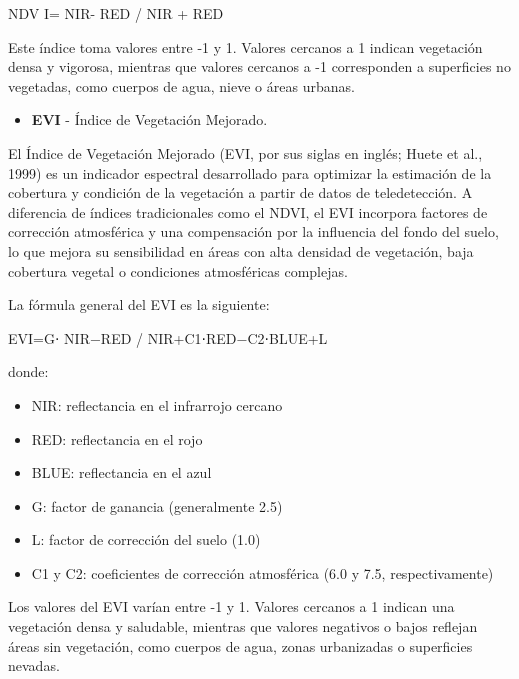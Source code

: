 \documentclass[
]{book}
\providecommand{\tightlist}{%
  \setlength{\itemsep}{0pt}\setlength{\parskip}{0pt}}
\begin{document}
NDV I= NIR- RED / NIR + RED

Este índice toma valores entre -1 y 1. Valores cercanos a 1 indican vegetación densa y vigorosa, mientras que valores cercanos a -1 corresponden a superficies no vegetadas, como cuerpos de agua, nieve o áreas urbanas.

\begin{itemize}
\tightlist
\item
  \textbf{EVI} - Índice de Vegetación Mejorado.
\end{itemize}

El Índice de Vegetación Mejorado (EVI, por sus siglas en inglés; Huete et al., 1999) es un indicador espectral desarrollado para optimizar la estimación de la cobertura y condición de la vegetación a partir de datos de teledetección. A diferencia de índices tradicionales como el NDVI, el EVI incorpora factores de corrección atmosférica y una compensación por la influencia del fondo del suelo, lo que mejora su sensibilidad en áreas con alta densidad de vegetación, baja cobertura vegetal o condiciones atmosféricas complejas.

La fórmula general del EVI es la siguiente:

EVI=G⋅ NIR−RED / NIR+C1\hspace{0pt}⋅RED−C2\hspace{0pt}⋅BLUE+L

donde:

\begin{itemize}
\tightlist
\item
  NIR: reflectancia en el infrarrojo cercano\\
\item
  RED: reflectancia en el rojo\\
\item
  BLUE: reflectancia en el azul\\
\item
  G: factor de ganancia (generalmente 2.5)\\
\item
  L: factor de corrección del suelo (1.0)\\
\item
  C1 y C2\hspace{0pt}: coeficientes de corrección atmosférica (6.0 y 7.5, respectivamente)
\end{itemize}

Los valores del EVI varían entre -1 y 1. Valores cercanos a 1 indican una vegetación densa y saludable, mientras que valores negativos o bajos reflejan áreas sin vegetación, como cuerpos de agua, zonas urbanizadas o superficies nevadas.
\end{document}
